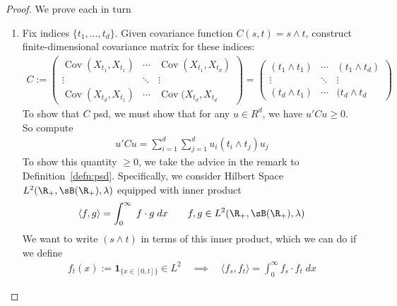 \documentclass[12pt]{article}
\theoremstyle{plain}
\theoremstyle{definition}
\theoremstyle{remark}
\newcommand{\one}[1]{\mathbf{1}_{#1}}
\newcommand{\Cov}{\operatorname{Cov}}
\begin{document}
\begin{proof}
We prove each in turn
\begin{enumerate}[label=(\roman*)]
  \item
    Fix indices $\{t_1,\ldots,t_d\}$. Given covariance function
    $C(s,t)=s\wedge t$, construct finite-dimensional covariance matrix
    for these indices:
    \begin{align*}
      C
      :=
      \begin{pmatrix}
        \Cov(X_{t_1},X_{t_1}) & \cdots & \Cov(X_{t_1},X_{t_d}) \\
        \vdots & \ddots &\vdots \\
        \Cov(X_{t_d},X_{t_1}) & \cdots & \Cov(X_{t_d},X_{t_d}
      \end{pmatrix}
      =
      \begin{pmatrix}
        (t_1 \wedge t_1) & \cdots & (t_1 \wedge t_d) \\
        \vdots & \ddots &\vdots \\
        (t_d \wedge t_1) & \cdots & (t_d \wedge t_d
      \end{pmatrix}
    \end{align*}
    To show that $C$ psd, we must show that for any $u\in R^d$,
    we have $u'Cu\geq 0$. So compute
    \begin{align}
      u'Cu
      = \sum_{i=1}^d\sum_{j=1}^d
        u_i (t_i\wedge t_j) u_j
      \label{psdbrownian}
    \end{align}
    To show this quantity $\geq 0$,
    we take the advice in the remark to Definition~\ref{defn:psd}.
    Specifically, we consider Hilbert Space
    $L^2(\R_+,\sB(\R_+),\lambda)$ equipped with inner product
    \begin{align*}
      \langle f,g\rangle =
      \int^\infty_0 \; f\cdot g \; dx
      \qquad f,g\in L^2(\R_+,\sB(\R_+),\lambda)
    \end{align*}
    We want to write $(s\wedge t)$ in terms of this inner product, which
    we can do if we define
    \begin{align*}
      f_{t}(x) := \one{\{x\in[0,t]\}}
      \in L^2
      \quad\implies\quad
      \langle f_s,f_t\rangle
      = \int_0^\infty f_{s}\cdot f_{t}\;dx

\end{align*}
\end{enumerate}
\end{proof}
\end{document}
